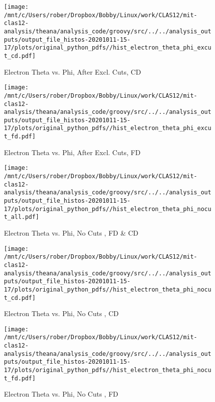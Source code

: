 \documentclass{article}
\begin{document}
\begin{landscape}
\begin{figure}[h]
        \texttt{[image: /mnt/c/Users/rober/Dropbox/Bobby/Linux/work/CLAS12/mit-clas12-analysis/theana/analysis\_code/groovy/src/../../analysis\_outputs/output\_file\_histos-20201011-15-17/plots/original\_python\_pdfs//hist\_electron\_theta\_phi\_excut\_cd.pdf]}
        \captionsetup{textformat=empty,labelformat=blank}
        \caption{Electron Theta vs. Phi, After Excl. Cuts, CD}
    \end{figure}
    \clearpage
    
    \begin{figure}[h]
        \centering

        \texttt{[image: /mnt/c/Users/rober/Dropbox/Bobby/Linux/work/CLAS12/mit-clas12-analysis/theana/analysis\_code/groovy/src/../../analysis\_outputs/output\_file\_histos-20201011-15-17/plots/original\_python\_pdfs//hist\_electron\_theta\_phi\_excut\_fd.pdf]}
        \captionsetup{textformat=empty,labelformat=blank}
        \caption{Electron Theta vs. Phi, After Excl. Cuts, FD}
    \end{figure}
    \clearpage
    
    \begin{figure}[h]
        \centering

        \texttt{[image: /mnt/c/Users/rober/Dropbox/Bobby/Linux/work/CLAS12/mit-clas12-analysis/theana/analysis\_code/groovy/src/../../analysis\_outputs/output\_file\_histos-20201011-15-17/plots/original\_python\_pdfs//hist\_electron\_theta\_phi\_nocut\_all.pdf]}
        \captionsetup{textformat=empty,labelformat=blank}
        \caption{Electron Theta vs. Phi, No Cuts , FD \& CD}
    \end{figure}
    \clearpage
    
    \begin{figure}[h]
        \centering

        \texttt{[image: /mnt/c/Users/rober/Dropbox/Bobby/Linux/work/CLAS12/mit-clas12-analysis/theana/analysis\_code/groovy/src/../../analysis\_outputs/output\_file\_histos-20201011-15-17/plots/original\_python\_pdfs//hist\_electron\_theta\_phi\_nocut\_cd.pdf]}
        \captionsetup{textformat=empty,labelformat=blank}
        \caption{Electron Theta vs. Phi, No Cuts , CD}
    \end{figure}
    \clearpage
    
    \begin{figure}[h]
        \centering

        \texttt{[image: /mnt/c/Users/rober/Dropbox/Bobby/Linux/work/CLAS12/mit-clas12-analysis/theana/analysis\_code/groovy/src/../../analysis\_outputs/output\_file\_histos-20201011-15-17/plots/original\_python\_pdfs//hist\_electron\_theta\_phi\_nocut\_fd.pdf]}
        \captionsetup{textformat=empty,labelformat=blank}
        \caption{Electron Theta vs. Phi, No Cuts , FD}
    \end{figure}
    \clearpage
    

\end{landscape}
\end{document}
